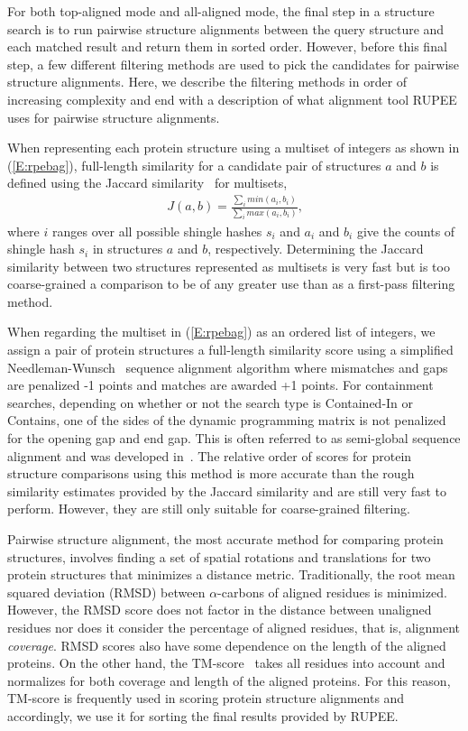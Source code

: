 \documentclass[10pt,letterpaper]{article}
\newcommand{\cas}{$\alpha$-carbons\xspace}
\begin{document}
For both top-aligned mode and all-aligned mode, the final step in a structure search is to run pairwise structure alignments between the query structure and each matched result and return them in sorted order. 
However, before this final step, a few different filtering methods are used to pick the candidates for pairwise structure alignments.
Here, we describe the filtering methods in order of increasing complexity and end with a description of what alignment tool RUPEE uses for pairwise structure alignments. 

When representing each protein structure using a multiset of integers as shown in (\ref{E:rpebag}), full-length similarity for a candidate pair of structures $a$ and $b$ is defined using the Jaccard similarity~\cite{Levan1971} for multisets,
\begin{align}
    J(a,b) = \frac{\sum_i min(a_i, b_i)}{\sum_i max(a_i,b_i)}\text{,}
\end{align}
where $i$ ranges over all possible shingle hashes $s_i$ and $a_i$ and $b_i$ give the counts of shingle hash $s_i$ in structures $a$ and $b$, respectively. 
Determining the Jaccard similarity between two structures represented as multisets is very fast but is too coarse-grained a comparison to be of any greater use than as a first-pass filtering method. 

When regarding the multiset in (\ref{E:rpebag}) as an ordered list of integers, we assign a pair of protein structures a full-length similarity score using a simplified Needleman-Wunsch~\cite{Needleman1970} sequence alignment algorithm where mismatches and gaps are penalized -1 points and matches are awarded +1 points.
For containment searches, depending on whether or not the search type is Contained-In or Contains, one of the sides of the dynamic programming matrix is not penalized for the opening gap and end gap.
This is often referred to as semi-global sequence alignment and was developed in~\cite{Brudno2003}. 
The relative order of scores for protein structure comparisons using this method is more accurate than the rough similarity estimates provided by the Jaccard similarity and are still very fast to perform. 
However, they are still only suitable for coarse-grained filtering. 

Pairwise structure alignment, the most accurate method for comparing protein structures, involves finding a set of spatial rotations and translations for two protein structures that minimizes a distance metric. 
Traditionally, the root mean squared deviation (RMSD) between \cas of aligned residues is minimized.
However, the RMSD score does not factor in the distance between unaligned residues nor does it consider the percentage of aligned residues, that is, alignment \emph{coverage}. 
RMSD scores also have some dependence on the length of the aligned proteins. 
On the other hand, the TM-score~\cite{Zhang2004} takes all residues into account and normalizes for both coverage and length of the aligned proteins. 
For this reason, TM-score is frequently used in scoring protein structure alignments and accordingly, we use it for sorting the final results provided by RUPEE.
\end{document}
